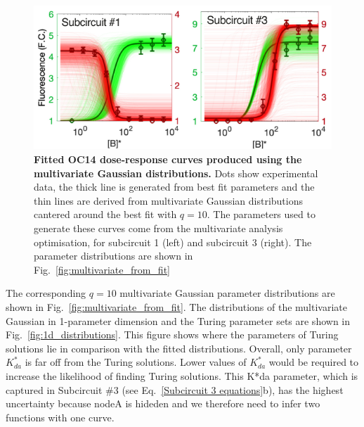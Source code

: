 \begin{figure}[H] %
    \centering
        \includegraphics[width=1\textwidth]{chapters/Chapter 2/dose_response_multivariate_gaussian} %
    \caption{\textbf{Fitted OC14 dose-response curves
    produced using the multivariate Gaussian distributions.}
    Dots show experimental data,
        the thick line is generated from best fit parameters and the thin lines are derived from multivariate Gaussian distributions cantered around the best fit with $q=10$.
        The parameters used to generate these curves come from the multivariate analysis optimisation, for subcircuit 1 (left) and subcircuit 3 (right). The parameter distributions are shown in Fig.~\ref{fig:multivariate_from_fit}}
    \label{fig:dose_response_multivariate_gaussian} %
\end{figure}
The corresponding $q=10$ multivariate Gaussian parameter distributions are shown in Fig.~\ref{fig:multivariate_from_fit}.
The distributions of the multivariate Gaussian in 1-parameter dimension and the Turing parameter sets are shown in Fig.~\ref{fig:1d_distributions}.
This figure shows where the parameters of Turing solutions lie in comparison with the fitted distributions.
Overall, only parameter $K^*_{da}$ is far off from the Turing solutions.
Lower values of $K^*_{da}$ would be required to increase the likelihood of finding Turing solutions.
This K*da parameter, which is captured in Subcircuit \#3 (see Eq.~\ref{Subcircuit 3 equations}b), has the highest uncertainty because nodeA is hideden and we therefore need to infer two functions with one curve.

